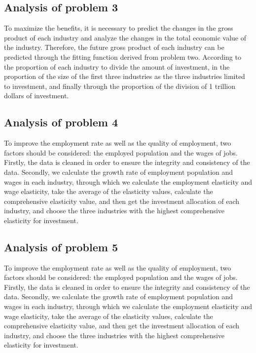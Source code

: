 \documentclass[12pt]{article}  %
\begin{document}
\subsection{Analysis of problem 3} %
	To maximize the benefits, it is necessary to predict the changes in the gross product of each industry and analyze the changes in the total economic value of the industry. Therefore, the future gross product of each industry can be predicted through the fitting function derived from problem two. According to the proportion of each industry to divide the amount of investment, in the proportion of the size of the first three industries as the three industries limited to investment, and finally through the proportion of the division of 1 trillion dollars of investment.
	
\subsection{Analysis of problem 4} %
	To improve the employment rate as well as the quality of employment, two factors should be considered: the employed population and the wages of jobs. Firstly, the data is cleaned in order to ensure the integrity and consistency of the data. Secondly, we calculate the growth rate of employment population and wages in each industry, through which we calculate the employment elasticity and wage elasticity, take the average of the elasticity values, calculate the comprehensive elasticity value, and then get the investment allocation of each industry, and choose the three industries with the highest comprehensive elasticity for investment.

\subsection{Analysis of problem 5} %
	To improve the employment rate as well as the quality of employment, two factors should be considered: the employed population and the wages of jobs. Firstly, the data is cleaned in order to ensure the integrity and consistency of the data. Secondly, we calculate the growth rate of employment population and wages in each industry, through which we calculate the employment elasticity and wage elasticity, take the average of the elasticity values, calculate the comprehensive elasticity value, and then get the investment allocation of each industry, and choose the three industries with the highest comprehensive elasticity for investment.
\end{document}
